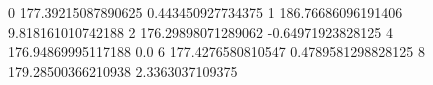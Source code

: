 0 177.39215087890625 0.443450927734375
1 186.76686096191406 9.818161010742188
2 176.29898071289062 -0.64971923828125
4 176.94869995117188 0.0
6 177.4276580810547 0.4789581298828125
8 179.28500366210938 2.3363037109375
